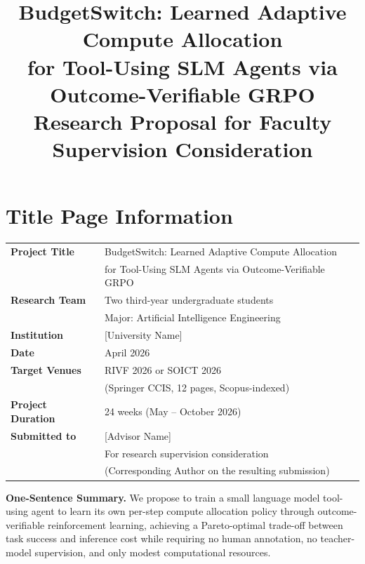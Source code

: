 \documentclass[11pt,a4paper]{article}
\title{\vspace{-1.5cm}\textbf{BudgetSwitch: Learned Adaptive Compute Allocation\\ for Tool-Using SLM Agents via Outcome-Verifiable GRPO}\\[0.3em]
\large Research Proposal for Faculty Supervision Consideration}
\author{}
\date{}
\begin{document}
\maketitle
\vspace{-2.5cm}

\section*{Title Page Information}

\noindent
\begin{tabular}{@{}p{}p{}@{}}
\textbf{Project Title} & BudgetSwitch: Learned Adaptive Compute Allocation \\
& for Tool-Using SLM Agents via Outcome-Verifiable GRPO \\[0.4em]
\textbf{Research Team} & Two third-year undergraduate students \\
& Major: Artificial Intelligence Engineering \\[0.4em]
\textbf{Institution} & [University Name] \\[0.4em]
\textbf{Date} & April 2026 \\[0.4em]
\textbf{Target Venues} & RIVF 2026 or SOICT 2026 \\
& (Springer CCIS, 12 pages, Scopus-indexed) \\[0.4em]
\textbf{Project Duration} & 24 weeks (May -- October 2026) \\[0.4em]
\textbf{Submitted to} & [Advisor Name] \\
& For research supervision consideration \\
& (Corresponding Author on the resulting submission) \\
\end{tabular}

\vspace{1em}

\noindent\textbf{One-Sentence Summary.} We propose to train a small language model tool-using agent to learn its own per-step compute allocation policy through outcome-verifiable reinforcement learning, achieving a Pareto-optimal trade-off between task success and inference cost while requiring no human annotation, no teacher-model supervision, and only modest computational resources.

\vspace{1.5em}

\end{document}
